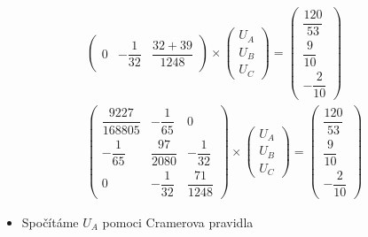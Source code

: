 \begin{center}
\begin{gather*}
\begin{pmatrix}
            0 & -\dfrac{1}{32} & \dfrac{32+39}{1248}
        \end{pmatrix} \times
        \begin{pmatrix}
            U_A \\[8pt]
            U_B \\[8pt]
            U_C
        \end{pmatrix} =
        \begin{pmatrix}
            \dfrac{120}{53} \\[8pt]
            \dfrac{9}{10} \\[8pt]
            -\dfrac{2}{10}
        \end{pmatrix} \\[8pt]
        \begin{pmatrix}
            \dfrac{9227}{168805} & -\dfrac{1}{65} & 0 \\[8pt]
            -\dfrac{1}{65} & \dfrac{97}{2080} & -\dfrac{1}{32} \\[8pt]
            0 & -\dfrac{1}{32} & \dfrac{71}{1248}
        \end{pmatrix} \times
        \begin{pmatrix}
            U_A \\[8pt]
            U_B \\[8pt]
            U_C
        \end{pmatrix} =
        \begin{pmatrix}
            \dfrac{120}{53} \\[8pt]
            \dfrac{9}{10} \\[8pt]
            -\dfrac{2}{10}
        \end{pmatrix}
    \end{gather*}
\end{center}

\newpage

\begin{itemize}
    \item Spočítáme $U_A$ pomoci Cramerova pravidla
\end{itemize}

